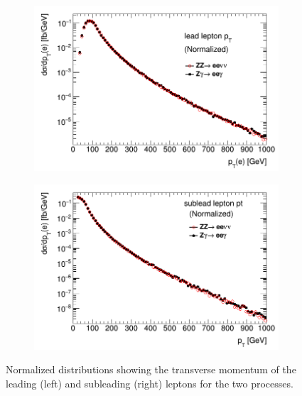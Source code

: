 \documentclass[11pt,a4paper,openright,twoside]{report}
\begin{document}
\begin{figure}[H]
\centering
	\begin{subfigure}{0.49\textwidth}
		\includegraphics[width=\linewidth]{leadpt.png}
		\caption{}
		\label{fig:leadpt}
	\end{subfigure}
	\begin{subfigure}{0.49\textwidth}
		\includegraphics[width=\linewidth]{subleadpt.png}
		\caption{}
		\label{fig:subleadpt}
	\end{subfigure}
	\caption{Normalized distributions showing the transverse momentum of the leading (left) and subleading (right) leptons for the two processes.}
	\label{fig:leppt}
\end{figure}
\end{document}
